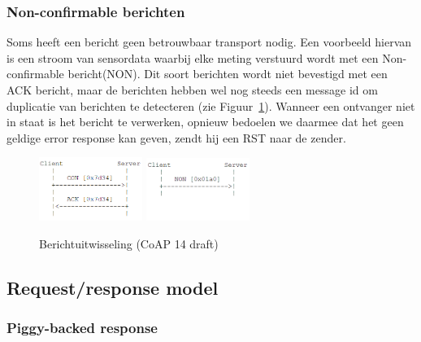 \subsubsection{Non-confirmable berichten}

Soms heeft een bericht geen betrouwbaar transport nodig. Een voorbeeld hiervan is een stroom van sensordata waarbij elke meting verstuurd wordt met een Non-confirmable bericht(NON). Dit soort berichten wordt niet bevestigd met een ACK bericht, maar de berichten hebben wel nog steeds een message id om duplicatie van berichten te detecteren (zie Figuur~\ref{fig:berichtuitwisseling}). Wanneer een ontvanger niet in staat is het bericht te verwerken, opnieuw bedoelen we daarmee dat het geen geldige error response kan geven, zendt hij een RST naar de zender.

\begin{figure}[h]
\vspace{10pt}
\centering
{}
{\includegraphics[width=0.3\textwidth]{fig/CoAPConfirmable}}
\hspace{30pt}
{\includegraphics[width=0.3\textwidth]{fig/CoAPNonConfirmable}}
\caption{Berichtuitwisseling (CoAP 14 draft)}
\label{fig:berichtuitwisseling}
\end{figure}

\subsection{Request/response model}

\subsubsection{Piggy-backed response}

